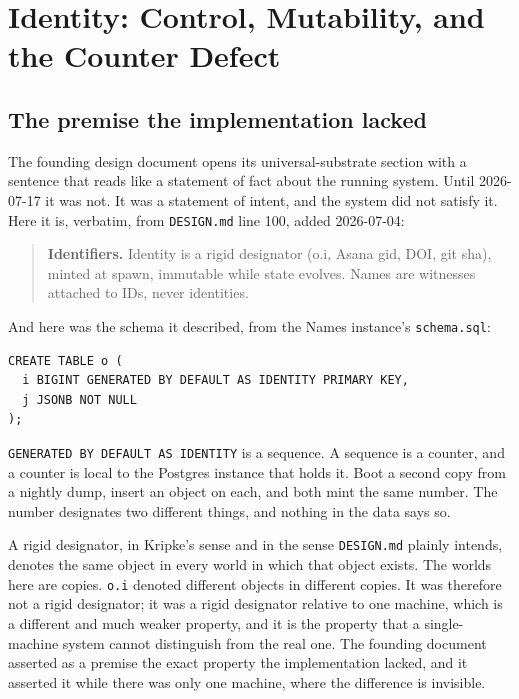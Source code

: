 \chapter{Identity: Control, Mutability, and the Counter Defect}

\section{The premise the implementation lacked}

The founding design document opens its universal-substrate section with a sentence that reads like a statement of fact about the running system. Until 2026-07-17 it was not. It was a statement of intent, and the system did not satisfy it. Here it is, verbatim, from \texttt{DESIGN.md} line 100, added 2026-07-04:

\begin{quote}
\textbf{Identifiers.} Identity is a rigid designator (o.i, Asana gid, DOI, git sha), minted at spawn, immutable while state evolves. Names are witnesses attached to IDs, never identities.
\end{quote}

And here was the schema it described, from the Names instance's \texttt{schema.sql}:

\begin{lstlisting}
CREATE TABLE o (
  i BIGINT GENERATED BY DEFAULT AS IDENTITY PRIMARY KEY,
  j JSONB NOT NULL
);
\end{lstlisting}

\texttt{GENERATED BY DEFAULT AS IDENTITY} is a sequence. A sequence is a counter, and a counter is local to the Postgres instance that holds it. Boot a second copy from a nightly dump, insert an object on each, and both mint the same number. The number designates two different things, and nothing in the data says so.

A rigid designator, in Kripke's sense and in the sense \texttt{DESIGN.md} plainly intends, denotes the same object in every world in which that object exists. The worlds here are copies. \texttt{o.i} denoted different objects in different copies. It was therefore not a rigid designator; it was a rigid designator relative to one machine, which is a different and much weaker property, and it is the property that a single-machine system cannot distinguish from the real one. The founding document asserted as a premise the exact property the implementation lacked, and it asserted it while there was only one machine, where the difference is invisible.

